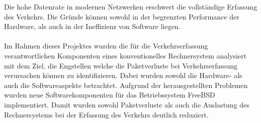 Die hohe Datenrate in modernen Netzwerken erschwert die vollständige Erfassung
des Verkehrs. Die Gründe können sowohl in der begrenzten Performance der
Hardware, als auch in der Ineffizienz von Software liegen.\\\\
%
Im Rahmen dieses Projektes wurden die für die Verkehrserfassung
verantwortlichen Komponenten eines konventionelles Rechnersystem analysiert mit
dem Ziel, die Engstellen welche die Paketverluste bei Verkehrserfassung
verursachen können zu identifizieren. Dabei wurden sowohl die Hardware- als
auch die Softwareaspekte betrachtet. Aufgrund der herausgestellten Problemen
wurden neue Softwarekomponenten für das Betriebssystem FreeBSD implementiert.
Damit wurden sowohl Paketverluste als auch die Auslastung des Rechnersystems
bei der Erfassung des Verkehrs deutlich reduziert.
